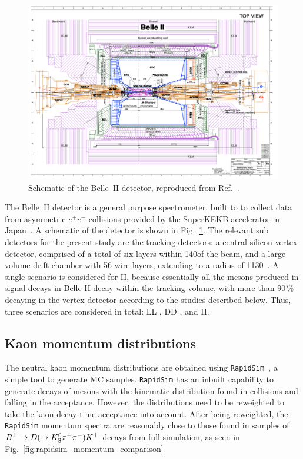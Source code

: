 \begin{figure}[tb]
  \centering
  \includegraphics[width=0.95\columnwidth]{figures/ks_chapter/belledetector.png}
  \caption{Schematic of the Belle~II detector, reproduced from Ref.~\cite{kouBelleIIPhysics2019}.}
  \label{fig:belleII_detector}
\end{figure}

The Belle~II detector is a general purpose spectrometer, built to to collect data from asymmetric $e^+e^-$ collisions provided by the SuperKEKB accelerator in Japan~\cite{ohnishiAcceleratorDesignSuperKEKB2013}. A schematic of the detector is shown in Fig.~\ref{fig:belleII_detector}. The relevant sub detectors for the present study are the tracking detectors: a central silicon vertex detector, comprised of a total of six layers within 140\mm of the beam, and a large volume drift chamber with 56 wire layers, extending to a radius of 1130\mm~\cite{kouBelleIIPhysics2019}. 
A single scenario is considered for \belle II, because essentially all the \KS mesons produced in signal decays in Belle II decay within the tracking volume, with more than 90\,\% decaying in the vertex detector according to the studies described below. Thus, three scenarios are considered in total: LL \lhcb, DD \lhcb, and \belle II.


\subsection{Kaon momentum distributions} %
\label{sub:kaon_momentum_distributions}

The neutral kaon momentum distributions are obtained using \texttt{RapidSim}~\cite{cowanRapidSimApplicationFast2017}, a simple tool to generate MC samples. \texttt{RapidSim} has an inbuilt capability to generate decays of \B mesons with the kinematic distribution found in \lhcb collisions and falling in the \lhcb acceptance. However, the distributions need to be reweighted to take the kaon-decay-time acceptance into account. After being reweighted, the \texttt{RapidSim} momentum spectra are reasonably close to those found in samples of ${{B}^\pm}\rightarrow{\ensuremath{D}}(\rightarrow{\ensuremath{{K}^0_{\mathrm{S}}}}{\ensuremath{{\pi}^+}}{\ensuremath{{\pi}^-}}){{K}^\pm}$ decays from full \lhcb simulation, as seen in Fig.~\ref{fig:rapidsim_momentum_comparison}


